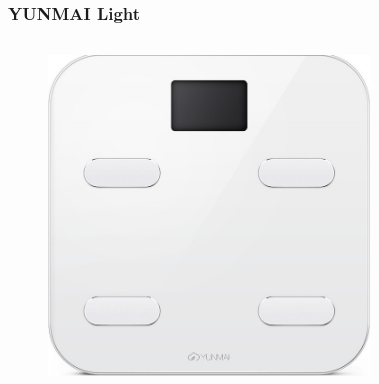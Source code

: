 \documentclass[UTF8]{ctexbeamer}
\begin{document}
\begin{frame}
  \frametitle{YUNMAI Light}
  \begin{columns}
  \begin{figure}
    \includegraphics[width=0.9\linewidth]{yunmai-haoqing.jpeg}
  \end{figure}
  \begin{figure}
    \centering
    \setlength{\fboxrule}{0.001cm}    %
    \setlength{\fboxsep}{0}
  \end{figure}
  \end{columns}
\end{frame}
\end{document}
